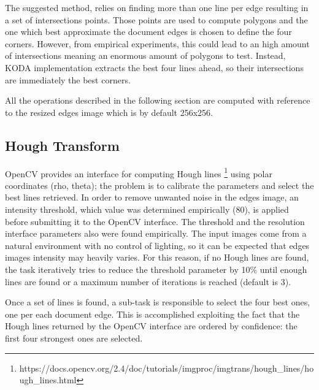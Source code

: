 \documentclass[a4paper]{article}
\begin{document}
The suggested method, relies on finding more than one line per edge resulting in a set of intersections points. Those points are used to compute polygons and the one which best approximate the document edges is chosen to define the four corners. However, from empirical experiments, this could lead to an high amount of intersections meaning an enormous amount of polygons to test. Instead, KODA implementation extracts the best four lines ahead, so their intersections are immediately the best corners.

All the operations described in the following section are computed with reference to the resized edges image which is by default 256x256.

\subsection{Hough Transform}

OpenCV provides an interface for computing Hough lines \footnote{https://docs.opencv.org/2.4/doc/tutorials/imgproc/imgtrans/hough\_lines/hough\_lines.html} using polar coordinates (rho, theta); the problem is to calibrate the parameters and select the best lines retrieved. In order to remove unwanted noise in the edges image, an intensity threshold, which value was determined empirically (80), is applied before submitting it to the OpenCV interface. The threshold and the resolution interface parameters also were found empirically. The input images come from a natural environment with no control of lighting, so it can be expected that edges images intensity may heavily varies. For this reason, if no Hough lines are found, the task iteratively tries to reduce the threshold parameter by 10\% until enough lines are found or a maximum number of iterations is reached (default is 3). 

Once a set of lines is found, a sub-task is responsible to select the four best ones, one per each document edge. This is accomplished exploiting the fact that the Hough lines returned by the OpenCV interface are ordered by confidence: the first four strongest ones are selected.
\end{document}

